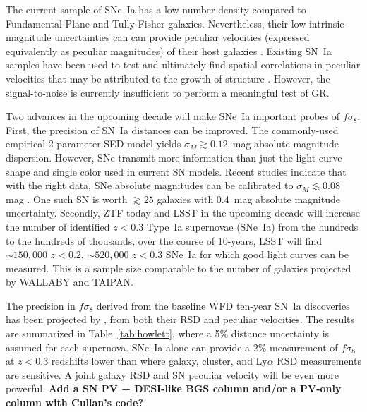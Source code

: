 \documentclass{aastex62}   	%
\begin{document}
The current sample of SNe~Ia has a low number density compared to Fundamental Plane and Tully-Fisher galaxies.
Nevertheless, their low intrinsic-magnitude uncertainties can 
can provide peculiar velocities (expressed equivalently as peculiar magnitudes)
of their host galaxies \citep{2006PhRvD..73l3526H,2011ApJ...741...67D}.  Existing SN~Ia samples
have been used to test and ultimately find spatial correlations in peculiar velocities that may be attributed to the growth of structure
\citep{2008MNRAS.389L..47A,2015JCAP...12..033H, 2017JCAP...05..015H}.
However, the signal-to-noise is currently insufficient to perform a meaningful test of GR.

Two advances in the upcoming decade will make SNe~Ia  important probes of $f\sigma_8$.
First, the precision of SN~Ia distances can be improved.  The commonly-used empirical 2-parameter SED model yields $\sigma_M \gtrsim 0.12$~mag absolute magnitude
dispersion.  However, SNe transmit more information than just the light-curve shape and single color used in current SN models.
Recent studies indicate that with the right data, SNe absolute
magnitudes can be calibrated to $\sigma_M \lesssim 0.08$ mag \citep[see e.g.][]{2012MNRAS.425.1007B, 2015ApJ...815...58F}.
One such SN is worth $\gtrsim 25$ galaxies with 0.4~mag absolute magnitude uncertainty.
Secondly,  ZTF today and LSST in the upcoming decade will increase the number of identified  $z<0.3$ Type~Ia supernovae (SNe~Ia)  from the hundreds to the
hundreds of thousands, over the course of 10-years, LSST will find $\sim150,000$ $z<0.2$,  $\sim520,000$ $z<0.3$ SNe~Ia for which good light curves can be measured. This is a sample size comparable to the number of galaxies projected by WALLABY and TAIPAN.

The precision in  $f\sigma_8$ derived from the baseline WFD ten-year SN~Ia discoveries has been projected by \citet{2017ApJ...847..128H},
from both their RSD and peculiar velocities.
The results are summarized in Table~\ref{tab:howlett}, where a 5\% distance uncertainty is assumed for each supernova.
SNe~Ia alone can provide a $2\%$ measurement of $f\sigma_8$ at $z<0.3$ redshifts lower than where galaxy, cluster, and Ly$\alpha$
RSD measurements are sensitive.  A joint galaxy RSD and SN peculiar velocity will be even more powerful.
{\bf Add a SN PV + DESI-like BGS column and/or a PV-only column with Cullan's code? }
\end{document}
